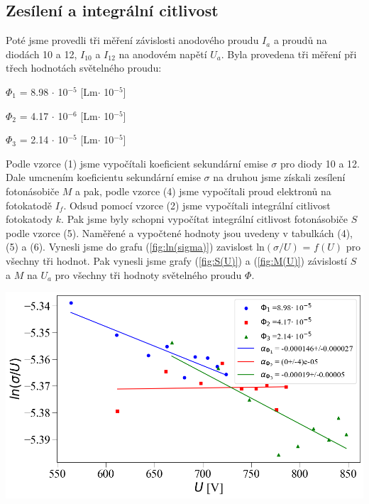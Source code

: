 \documentclass[a4paper,11pt]{article}
\begin{document}
\begin{minipage}[t]{0.5\textwidth}
            \subsection{Zesílení a integrální citlivost}
                Poté jsme provedli tři měření závislosti anodového proudu $I_a$ a proudů na diodách 10 a 12, $I_{10}$ a $I_{12}$ na anodovém napětí $U_a$. Byla provedena tři měření při třech hodnotách světelného proudu:
                \begin{center}
                    $\Phi_1$ = 8.98 $\cdot$ 10$^{-5}$ [Lm$\cdot$ 10$^{-5}$]
                    \par $\Phi_2$ = 4.17 $\cdot$ 10$^{-6}$ [Lm$\cdot$ 10$^{-5}$]
                    \par $\Phi_3$ = 2.14 $\cdot$ 10$^{-5}$ [Lm$\cdot$ 10$^{-5}$]
                \end{center}
                \par Podle vzorce (1) jsme vypočítali koeficient sekundární emise $\sigma$ pro diody 10 a 12. Dale umcnením koeficientu sekundární emise $\sigma$ na druhou jsme získali zesílení fotonásobiče $M$ a pak, podle vzorce (4) jsme vypočítali proud elektronů na fotokatodě $I_f$. Odsud pomocí vzorce (2) jsme vypočítali integrální citlivost fotokatody $k$. Pak jsme byly schopni vypočítat integrální citlivost fotonásobiče $S$ podle vzorce (5). Naměřené a vypočtené hodnoty jsou uvedeny v tabulkách (4), (5) a (6). Vynesli jsme do grafu (\ref{fig:ln(sigma)}) zavislost ln$(\sigma / U)$ = $f(U)$ pro všechny tři hodnot. Pak vynesli jsme grafy (\ref{fig:S(U)}) a (\ref{fig:M(U)}) závislostí $S$ a $M$ na $U_a$ pro všechny tři hodnoty světelného proudu $\Phi$.
                
                \vspace{10pt}   
                \par \centering
                \includegraphics[scale=0.33]{ln(sigma)}
                \captionsetup{justification=centering, font=footnotesize}
                \label{fig:ln(sigma)}
                \vspace{10pt}
                \raggedright 

    \end{minipage}
\end{document}
